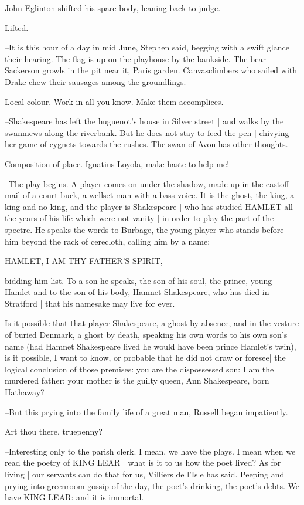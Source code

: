 John Eglinton shifted his spare body,
leaning back to judge.

Lifted.

--It is this hour of a day in mid June,
Stephen said,
begging with a swift glance their hearing.
The flag is up on the playhouse by the bankside.
The bear Sackerson growls in the pit near it,
Paris garden.
Canvasclimbers who sailed with Drake chew their sausages among the groundlings.

Local colour.
Work in all you know.
Make them accomplices.

--Shakespeare has left the huguenot's house in Silver street |
and walks by the swanmews along the riverbank.
But he does not stay to feed the pen |
chivying her game of cygnets towards the rushes.
The swan of Avon has other thoughts.

Composition of place.
Ignatius Loyola,
make haste to help me!

--The play begins.
A player comes on under the shadow,
made up in the castoff mail of a court buck,
a wellset man with a bass voice.
It is the ghost,
the king,
a king and no king,
and the player is Shakespeare |
who has studied HAMLET all the years of his life which were not vanity |
in order to play the part of the spectre.
He speaks the words to Burbage,
the young player who stands before him beyond the rack of cerecloth,
calling him by a name:

    HAMLET, I AM THY FATHER'S SPIRIT,

bidding him list.
To a son he speaks,
the son of his soul,
the prince,
young Hamlet and to the son of his body,
Hamnet Shakespeare,
who has died in Stratford |
that his namesake may live for ever.

Is it possible that that player Shakespeare,
a ghost by absence,
and in the vesture of buried Denmark,
a ghost by death,
speaking his own words to his own son's name
(had Hamnet Shakespeare lived he would have been prince Hamlet's twin),
is it possible,
I want to know,
or probable that he did not draw or foresee|
the logical conclusion of those premises:
you are the dispossessed son:
I am the murdered father:
your mother is the guilty queen,
Ann Shakespeare,
born Hathaway?

--But this prying into the family life of a great man,
Russell began impatiently.

Art thou there,
truepenny?

--Interesting only to the parish clerk.
I mean,
we have the plays.
I mean when we read the poetry of KING LEAR |
what is it to us how the poet lived?
As for living |
our servants can do that for us,
Villiers de l'Isle has said.
Peeping and prying into greenroom gossip of the day,
the poet's drinking,
the poet's debts.
We have KING LEAR:
and it is immortal.

